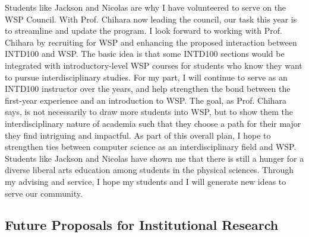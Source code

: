 \documentclass[../../../main.tex]{subfiles}
\begin{document}
Students like Jackson and Nicolas are why I have volunteered to serve on the WSP Council.  With Prof. Chihara now leading the council, our task this year is to streamline and update the program.  I look forward to working with Prof. Chihara by recruiting for WSP and enhancing the proposed interaction between INTD100 and WSP.  The basic idea is that some INTD100 sections would be integrated with introductory-level WSP courses for students who know they want to pursue interdisciplinary studies.  For my part, I will continue to serve as an INTD100 instructor over the years, and help strengthen the bond between the first-year experience and an introduction to WSP.  The goal, as Prof. Chihara says, is not necessarily to draw more students into WSP, but to show them the interdisciplinary nature of academia such that they choose a path for their major they find intriguing and impactful.  As part of this overall plan, I hope to strengthen ties between computer science as an interdisciplinary field and WSP.  Students like Jackson and Nicolas have shown me that there is still a hunger for a diverse liberal arts education among students in the physical sciences.  Through my advising and service, I hope my students and I will generate new ideas to serve our community.

\subsection{Future Proposals for Institutional Research}
\end{document}
